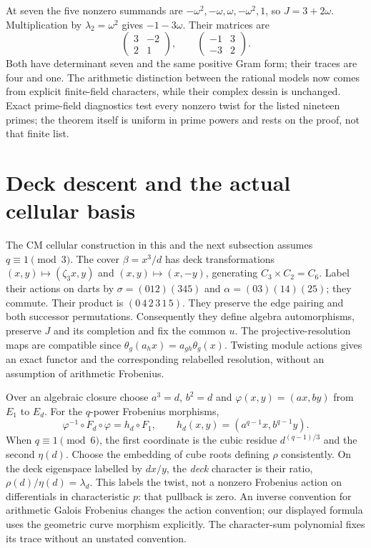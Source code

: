 At seven the five nonzero summands are $-\omega^2,-\omega,\omega,-\omega^2,1$, so $J=3+2\omega$. Multiplication by $\lambda_2=\omega^2$ gives $-1-3\omega$. Their matrices are
\[
 \begin{pmatrix}3&-2\\2&1\end{pmatrix},\qquad
 \begin{pmatrix}-1&3\\-3&2\end{pmatrix}.
\]
Both have determinant seven and the same positive Gram form; their traces are four and one. The arithmetic distinction between the rational models now comes from explicit finite-field characters, while their complex dessin is unchanged. Exact prime-field diagnostics test every nonzero twist for the listed nineteen primes; the theorem itself is uniform in prime powers and rests on the proof, not that finite list.

\section{Deck descent and the actual cellular basis}
The CM cellular construction in this and the next subsection assumes $q\equiv1\pmod3$.
The cover $\beta=x^3/d$ has deck transformations $(x,y)\mapsto(\zeta_3x,y)$ and $(x,y)\mapsto(x,-y)$, generating $C_3\times C_2=C_6$. Label their actions on darts by $\sigma=(012)(345)$ and $\alpha=(03)(14)(25)$; they commute. Their product is $(0\,4\,2\,3\,1\,5)$. They preserve the edge pairing and both successor permutations. Consequently they define algebra automorphisms, preserve $J$ and its completion and fix the common $u$. The projective-resolution maps are compatible since $\theta_g(a_hx)=a_{gh}\theta_g(x)$. Twisting module actions gives an exact functor and the corresponding relabelled resolution, without an assumption of arithmetic Frobenius.

Over an algebraic closure choose $a^3=d$, $b^2=d$ and $\varphi(x,y)=(ax,by)$ from $E_1$ to $E_d$. For the $q$-power Frobenius morphisms,
\[
 \varphi^{-1}\circ F_d\circ\varphi=h_d\circ F_1,\qquad
 h_d(x,y)=(a^{q-1}x,b^{q-1}y).
\]
When $q\equiv1\pmod6$, the first coordinate is the cubic residue $d^{(q-1)/3}$ and the second $\eta(d)$. Choose the embedding of cube roots defining $\rho$ consistently. On the deck eigenspace labelled by $dx/y$, the \emph{deck} character is their ratio, $\rho(d)/\eta(d)=\lambda_d$. This labels the twist, not a nonzero Frobenius action on differentials in characteristic $p$: that pullback is zero. An inverse convention for arithmetic Galois Frobenius changes the action convention; our displayed formula uses the geometric curve morphism explicitly. The character-sum polynomial fixes its trace without an unstated convention.

